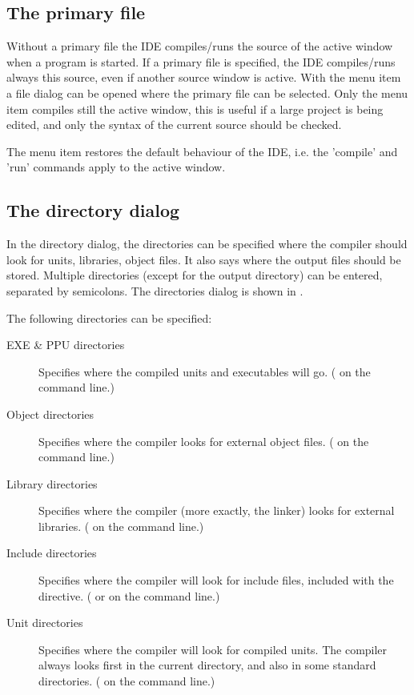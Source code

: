 \subsection{The primary file}
\label{se:primaryfile}
Without a primary file the IDE compiles/runs the source of the active
window when a program is started. If a primary file is specified, 
the IDE compiles/runs always this source, even if another
source window is active. With the menu item 
a file dialog can be opened where the primary file can be selected. 
Only the menu item  compiles still the active window, 
this is useful if a large project is being edited, and only the syntax of 
the current source should be checked. 

The menu item  restores the default
behaviour of the IDE, i.e. the 'compile' and 'run' commands apply to the 
active window.
%
%
\subsection{The directory dialog}
In the directory dialog, the directories can be specified where the 
compiler should look for units, libraries, object files. It also says
where the output files should be stored. Multiple directories (except 
for the output directory) can be entered, separated by semicolons.
The directories dialog is shown in .


The following directories can be specified:
\begin{description}
\item[EXE \& PPU directories] Specifies where the compiled units and
executables will go. ( on the command line.)
\item[Object directories] Specifies where the compiler looks for external
object files. ( on the command line.)
\item[Library directories] Specifies where the compiler (more exactly, the
linker) looks for external libraries. ( on the command line.)
\item[Include directories] Specifies where the compiler will look for 
include files, included with the  directive. 
( or  on the command line.)
\item[Unit directories] Specifies where the compiler will look for compiled
units. The compiler always looks first in the current directory, and also in
some standard directories. ( on the command line.)
\end{description}
%
%
